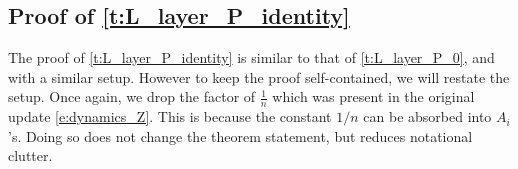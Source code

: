 \documentclass{article}
\begin{document}
\fi












\subsection{Proof of \autoref{t:L_layer_P_identity}}
The proof of \autoref{t:L_layer_P_identity} is similar to that of \autoref{t:L_layer_P_0}, and with a similar setup. However to keep the proof self-contained, we will restate the setup. Once again, we drop the factor of $\frac{1}{n}$ which was present in the original update \eqref{e:dynamics_Z}. This is because the constant $1/n$ can be absorbed into $A_i$'s. Doing so does not change the theorem statement, but reduces notational clutter.
\end{document}
